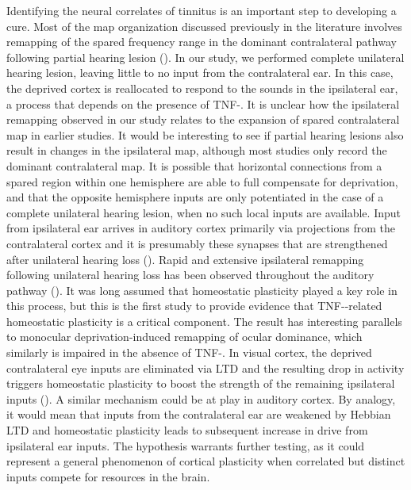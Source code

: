  Identifying the neural correlates of tinnitus is an important step to developing a cure. Most of the map organization discussed previously in the literature involves remapping of the spared frequency range in the dominant contralateral pathway following partial hearing lesion (\cite{Robertson1989, Norena2005, Dong2010}). In our study, we performed complete unilateral hearing lesion, leaving little to no input from the contralateral ear. In this case, the deprived cortex is reallocated to respond to the sounds in the ipsilateral ear, a process that depends on the presence of TNF-\textalpha{}. It is unclear how the ipsilateral remapping observed in our study relates to the expansion of spared contralateral map in earlier studies. It would be interesting to see if partial hearing lesions also result in changes in the ipsilateral map, although most studies only record the dominant contralateral map. It is possible that horizontal connections from a spared region within one hemisphere are able to full compensate for deprivation, and that the opposite hemisphere inputs are only potentiated in the case of a complete unilateral hearing lesion, when no such local inputs are available. Input from ipsilateral ear arrives in auditory cortex primarily via projections from the contralateral cortex and it is presumably these synapses that are strengthened after unilateral hearing loss (\cite{Yorke1975}). Rapid and extensive ipsilateral remapping following unilateral hearing loss has been observed throughout the auditory pathway (\cite{Mossop2000}). It was long assumed that homeostatic plasticity played a key role in this process, but this is the first study to provide evidence that TNF-\textalpha{}-related homeostatic plasticity is a critical component. The result has interesting parallels to monocular deprivation-induced remapping of ocular dominance, which similarly is impaired in the absence of TNF-\textalpha{}. In visual cortex, the deprived contralateral eye inputs are eliminated via LTD and the resulting drop in activity triggers homeostatic plasticity to boost the strength of the remaining ipsilateral inputs (\cite{Kaneko2008}). A similar mechanism could be at play in auditory cortex. By analogy, it would mean that inputs from the contralateral ear are weakened by Hebbian LTD and homeostatic plasticity leads to subsequent increase in drive from ipsilateral ear inputs. The hypothesis warrants further testing, as it could represent a general phenomenon of cortical plasticity when correlated but distinct inputs compete for resources in the brain.

\printbibliography